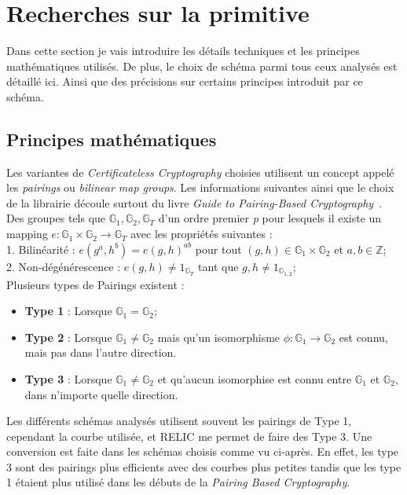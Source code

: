 \section{Recherches sur la primitive}
\label{sec:primitiveSearch}
Dans cette section je vais introduire les détails techniques et les principes mathématiques utilisés. De plus, le choix de schéma parmi tous ceux analysés est détaillé ici. Ainsi que des précisions sur certains principes introduit par ce schéma.
\subsection{Principes mathématiques}
Les variantes de \textit{Certificateless Cryptography} choisies utilisent un concept appelé les \textit{pairings} ou \textit{bilinear map groups}. Les informations suivantes ainsi que le choix de la librairie découle surtout du livre \textit{Guide to Pairing-Based Cryptography}~\cite{bookPairing}.
Des groupes tels que $\mathbb{G}_1, \mathbb{G}_2, \mathbb{G}_T$ d'un ordre premier \textit{p} pour lesquels il existe un mapping $e : \mathbb{G}_1 \times \mathbb{G}_2 \rightarrow \mathbb{G}_T$ avec les propriétés suivantes :\\
1. Bilinéarité : $e(g^a, h^b) = e(g, h)^{ab}$ pour tout $(g,h) \in \mathbb{G}_1 \times \mathbb{G}_2$ et $a,b \in \mathbb{Z}$;\\
2. Non-dégénérescence : $e(g,h) \neq 1_{\mathbb{G}_T} $ tant que $g,h \neq 1_{\mathbb{G}_{1,2}}$;\\
Plusieurs types de Pairings existent :\\
\begin{itemize}
	\item \textbf{Type 1} : Lorsque $\mathbb{G}_1 = \mathbb{G}_2$;
	\item \textbf{Type 2} : Lorsque $\mathbb{G}_1 \ne \mathbb{G}_2$ mais qu'un isomorphisme $\phi : \mathbb{G}_1 \rightarrow \mathbb{G}_2$ est connu, mais pas dans l'autre direction.
	\item \textbf{Type 3} : Lorsque $\mathbb{G}_1 \ne \mathbb{G}_2$ et qu'aucun isomorphise est connu entre $\mathbb{G}_1$ et $\mathbb{G}_2$, dans n'importe quelle direction.
\end{itemize}
Les différents schémas analysés utilisent souvent les pairings de Type 1, cependant la courbe utilisée, et RELIC me permet de faire des Type 3. Une conversion est faite dans les schémas choisis comme vu ci-après. En effet, les type 3 sont des pairings plus efficients avec des courbes plus petites tandis que les type 1 étaient plus utilisé dans les débuts de la \textit{Pairing Based Cryptography}.
